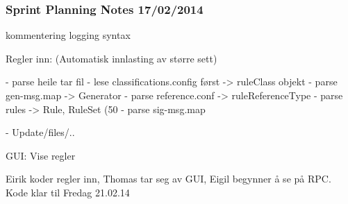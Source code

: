 \subsubsection{Sprint Planning Notes 17/02/2014}
kommentering
logging
syntax

Regler inn: (Automatisk innlasting av større sett)

- parse heile tar fil\newline
- lese classifications.config først -> ruleClass objekt\newline
- parse gen-msg.map -> Generator\newline
- parse reference.conf -> ruleReferenceType\newline
- parse rules -> Rule, RuleSet (50%
- parse sig-msg.map\newline

- Update/files/..\newline

GUI: Vise regler\newline

Eirik koder regler inn, Thomas tar seg av GUI, Eigil begynner å se på
RPC.\newline
Kode klar til Fredag 21.02.14